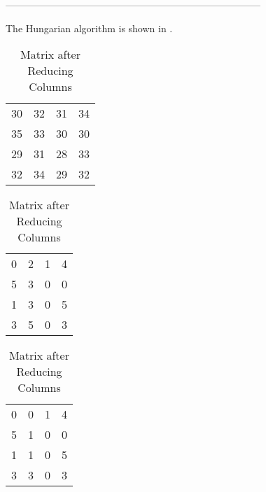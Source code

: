 ------------------------------------------------------------------------------
% 
%
%

\begin{subquestions}
	
\subquestion
	
\begin{subsubquestions}
		
\subsubquestion
		
The Hungarian algorithm is shown in .
		
		\begin{table}[!hbt]
			\begin{minipage}{0.3\textwidth}
				\centering
				\begin{tabular}{cccc}
					30 & 32 & 31 & 34 \\
					35 & 33 & 30 & 30 \\
					29 & 31 & 28 & 33 \\
					32 & 34 & 29 & 32 \\
				\end{tabular}
				\captionsetup{width=1.1\linewidth}
				\caption*{Matrix From question}
			\end{minipage}
			\hspace{20pt}
			\begin{minipage}{0.3\textwidth}
				\centering
				\begin{tabular}{cccc}
					0 & 2 & 1 & 4 \\
					5 & 3 & 0 & 0 \\
					1 & 3 & 0 & 5 \\
					3 & 5 & 0 & 3 \\
				\end{tabular}
				\captionsetup{width=1.1\linewidth}
				\caption*{Matrix after Reducing Rows}
			\end{minipage}
			\hspace{20pt}
			\begin{minipage}{0.3\textwidth}
				\centering
				\begin{tabular}{cccc}
					0 & 0 & 1 & 4 \\
					5 & 1 & 0 & 0 \\
					1 & 1 & 0 & 5 \\
					3 & 3 & 0 & 3 \\
				\end{tabular}
				\captionsetup{width=1.1\linewidth}
				\caption*{Matrix after Reducing Columns} 
			\end{minipage}
			

\end{table}
\end{subsubquestions}
\end{subquestions}
